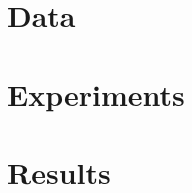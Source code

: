 \documentclass[11pt]{article}
\begin{document}
\section{Data}
\label{sec:data}


\section{Experiments}


\section{Results}


 


%
%
%
%
%
%
%
\end{document}
